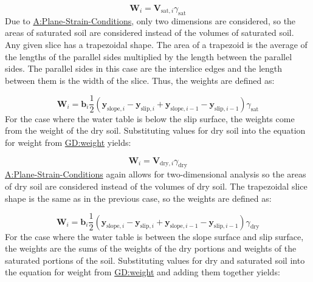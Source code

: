 \documentclass[12pt]{article}
\begin{document}
\begin{displaymath}
{\symbf{W}}_{i}={\symbf{V}_{\text{sat},i}} {γ_{\text{sat}}}
\end{displaymath}
Due to \hyperref[assumpPSC]{A:Plane-Strain-Conditions}, only two dimensions are considered, so the areas of saturated soil are considered instead of the volumes of saturated soil. Any given slice has a trapezoidal shape. The area of a trapezoid is the average of the lengths of the parallel sides multiplied by the length between the parallel sides. The parallel sides in this case are the interslice edges and the length between them is the width of the slice. Thus, the weights are defined as:

\begin{displaymath}
{\symbf{W}}_{i}={\symbf{b}}_{i} \frac{1}{2} \left({\symbf{y}_{\text{slope},i}}-{\symbf{y}_{\text{slip},i}}+{\symbf{y}_{\text{slope},i-1}}-{\symbf{y}_{\text{slip},i-1}}\right) {γ_{\text{sat}}}
\end{displaymath}
For the case where the water table is below the slip surface, the weights come from the weight of the dry soil. Substituting values for dry soil into the equation for weight from \hyperref[GD:weight]{GD:weight} yields:

\begin{displaymath}
{\symbf{W}}_{i}={\symbf{V}_{\text{dry},i}} {γ_{\text{dry}}}
\end{displaymath}
\hyperref[assumpPSC]{A:Plane-Strain-Conditions} again allows for two-dimensional analysis so the areas of dry soil are considered instead of the volumes of dry soil. The trapezoidal slice shape is the same as in the previous case, so the weights are defined as:

\begin{displaymath}
{\symbf{W}}_{i}={\symbf{b}}_{i} \frac{1}{2} \left({\symbf{y}_{\text{slope},i}}-{\symbf{y}_{\text{slip},i}}+{\symbf{y}_{\text{slope},i-1}}-{\symbf{y}_{\text{slip},i-1}}\right) {γ_{\text{dry}}}
\end{displaymath}
For the case where the water table is between the slope surface and slip surface, the weights are the sums of the weights of the dry portions and weights of the saturated portions of the soil. Substituting values for dry and saturated soil into the equation for weight from \hyperref[GD:weight]{GD:weight} and adding them together yields:
\end{document}
